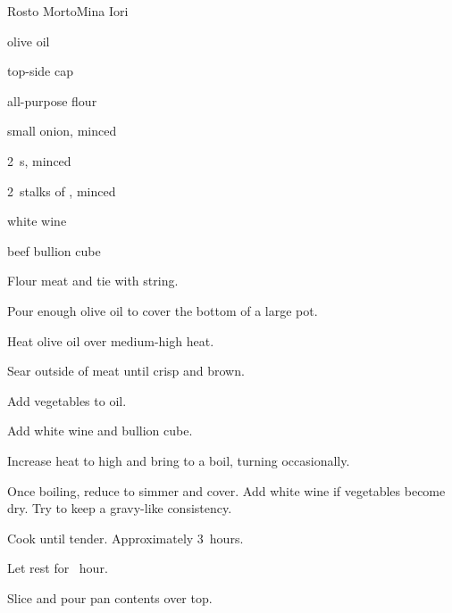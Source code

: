 \begin{recipe}{Rosto Morto}{Mina Iori}{}

\begin{ingredients}
\item olive oil
\item \kgr{1\half}  top-side cap
\item all-purpose flour
\item small onion, minced
\item 2~s, minced
\item 2~stalks of , minced
\item white wine
\item beef bullion cube
\end{ingredients}

\begin{directions}
\item Flour meat and tie with string.
\item Pour enough olive oil to cover the bottom of a large pot.
\item Heat olive oil over medium-high heat.
\item Sear outside of meat until crisp and brown.
\item Add vegetables to oil.
\item Add white wine and bullion cube.
\item Increase heat to high and bring to a boil, turning occasionally.
\item Once boiling, reduce to simmer and cover. Add white wine if vegetables become dry. Try to keep a gravy-like consistency.
\item Cook until tender. Approximately 3~hours.
\item Let rest for \half~hour.
\item Slice and pour pan contents over top.
\end{directions}

\end{recipe}
